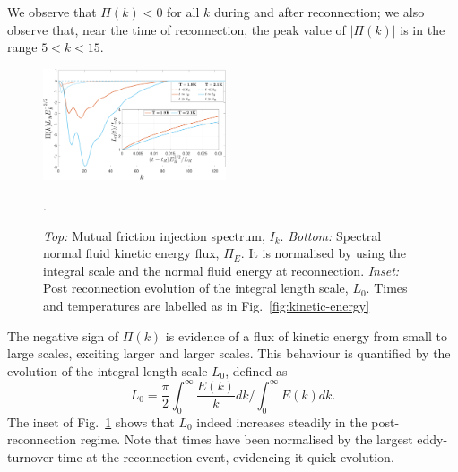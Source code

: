 \documentclass[%
 reprint,
 amsmath,amssymb,
 aps,
 prl,
]{revtex4-2}
\def \v{\mathbf{v}}
\def \k{\mathbf{k}}
\newcommand*{\NOTE}[1]{\textbf{\color{red}[#1]}}
\begin{document}
{%
We observe that $\Pi(k) < 0$ for all $k$ during and after reconnection;
we also observe that, near the time of reconnection,
the peak value of $|\Pi(k)|$ is in the range $5 < k < 15$.
%
\begin{figure}[t]
    \centering
    \includegraphics*[width=0.48\textwidth]{flux-spec.pdf}
\caption{\emph{Top:} Mutual friction injection spectrum, $I_k$. 
\emph{Bottom:} Spectral normal fluid kinetic energy flux, $\Pi_E$. It is normalised by using the integral scale and the normal fluid energy at reconnection.
\emph{Inset:} Post reconnection evolution of the integral length scale, $L_0$.
Times and temperatures are labelled as in Fig.~\ref{fig:kinetic-energy}}.
\label{fig:energy-flux}
\end{figure}
%
The negative sign of $\Pi(k)$ is evidence of a flux of kinetic  energy from small to large scales, exciting larger and larger scales.%
This behaviour is quantified by the evolution of the integral length scale $L_0$, defined as
\begin{equation}
    L_0 = \frac{\pi}{2 }\int_0^{\infty}\frac{E(k)}{k}dk \Big/ \int_0^{\infty}\!\!E(k)dk.
\end{equation}
The inset of Fig.~\ref{fig:energy-flux} shows that
$L_0$ indeed  increases steadily in the post-reconnection regime. Note that times have been normalised by the largest eddy-turnover-time at the reconnection event, evidencing  it quick evolution.

}
\end{document}
